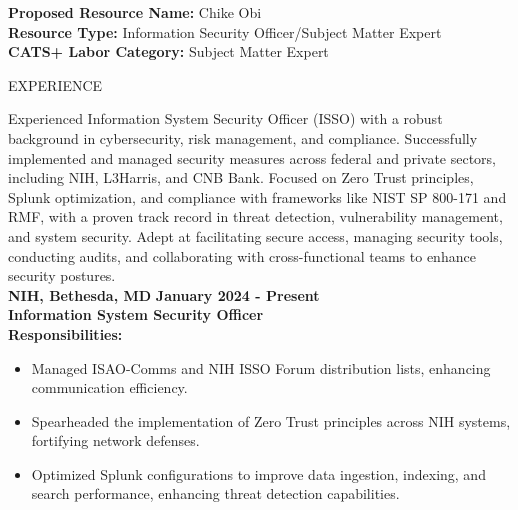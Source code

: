 \documentclass{resume} %
\begin{document}
\begin{flushleft}
    \textbf{Proposed Resource Name:} Chike Obi \\
    \textbf{Resource Type:} Information Security Officer/Subject Matter Expert \\
    \textbf{CATS+ Labor Category:} Subject Matter Expert
\end{flushleft}

\vspace{1.3em}

\begin{rSection}{EXPERIENCE}
        \begin{flushleft}
        Experienced Information System Security Officer (ISSO) with a robust background in cybersecurity, risk management, and compliance. Successfully implemented and managed security measures across federal and private sectors, including NIH, L3Harris, and CNB Bank. Focused on Zero Trust principles, Splunk optimization, and compliance with frameworks like NIST SP 800{-}171 and RMF, with a proven track record in threat detection, vulnerability management, and system security. Adept at facilitating secure access, managing security tools, conducting audits, and collaborating with cross{-}functional teams to enhance security postures. \\
        \vspace{1em} 
            \textbf{NIH, Bethesda, MD} \hfill \textbf{January 2024 {-} Present} \\
            \textbf{Information System Security Officer} \\
            \vspace{1em}
            \textbf{Responsibilities:} \\
            \begin{itemize}
                                    \item Managed ISAO{-}Comms and NIH ISSO Forum distribution lists, enhancing communication efficiency.
                                    \item Spearheaded the implementation of Zero Trust principles across NIH systems, fortifying network defenses.
                                    \item Optimized Splunk configurations to improve data ingestion, indexing, and search performance, enhancing threat detection capabilities.

\end{itemize}
\end{flushleft}
\end{rSection}
\end{document}
